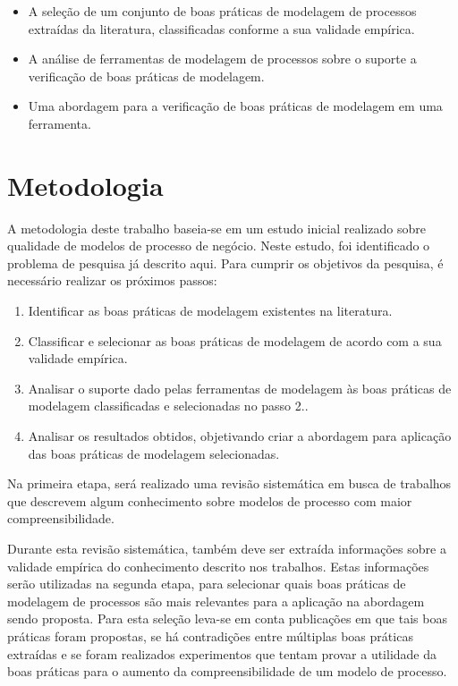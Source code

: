 \documentclass[12pt]{article}
\begin{document}
\begin{itemize}
	\item A seleção de um conjunto de boas práticas de modelagem de processos extraídas da literatura, classificadas conforme a sua validade empírica.
	\item A análise de ferramentas de modelagem de processos sobre o suporte a verificação de boas práticas de modelagem.
	\item Uma abordagem para a verificação de boas práticas de modelagem em uma ferramenta.
\end{itemize}

\section{Metodologia}

A metodologia deste trabalho baseia-se em um estudo inicial realizado sobre qualidade de modelos de processo de negócio. Neste estudo, foi identificado o problema de pesquisa já descrito aqui. Para cumprir os objetivos da pesquisa, é necessário realizar os próximos passos:
\begin{enumerate}
	\item Identificar as boas práticas de modelagem existentes na literatura.
	\item Classificar e selecionar as boas práticas de modelagem de acordo com a sua validade empírica.
	\item Analisar o suporte dado pelas ferramentas de modelagem às boas práticas de modelagem classificadas e selecionadas no passo 2..
	\item Analisar os resultados obtidos, objetivando criar a abordagem para aplicação das boas práticas de modelagem selecionadas. 
\end{enumerate}

Na primeira etapa, será realizado uma revisão sistemática em busca de trabalhos que descrevem algum conhecimento sobre modelos de processo com maior compreensibilidade. 

Durante esta revisão sistemática, também deve ser extraída informações sobre a validade empírica do conhecimento descrito nos trabalhos. Estas informações serão utilizadas na segunda etapa, para selecionar quais boas práticas de modelagem de processos são mais relevantes para a aplicação na abordagem sendo proposta. Para esta seleção leva-se em conta publicações em que tais boas práticas foram propostas, se há contradições entre múltiplas boas práticas extraídas e se foram realizados experimentos que tentam provar a utilidade da boas práticas para o aumento da compreensibilidade de um modelo de processo.
\end{document}

